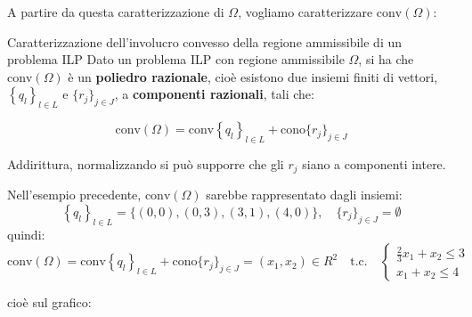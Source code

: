 \documentclass[a4paper,11pt]{article}
\begin{document}
A partire da questa caratterizzazione di $\Omega$, vogliamo caratterizzare $\mathrm{conv} (\Omega)$:

\begin{theorem}{Caratterizzazione dell'involucro convesso della regione ammissibile di un problema ILP}
	Dato un problema ILP con regione ammissibile $\Omega$, si ha che $\mathrm{conv}(\Omega)$ è un \textbf{poliedro razionale}, cioè esistono due insiemi finiti di vettori, $\left\{ q_l \right\}_{l \in L}$ e $\{ r_j \}_{j \in J}$, a \textbf{componenti razionali}, tali che:

$$
\mathrm{conv}(\Omega) = \mathrm{conv} \left\{ q_l \right\}_{l \in L} + \mathrm{cono} \{ r_j \}_{j \in J}
$$

\end{theorem}

Addirittura, normalizzando si può supporre che gli $r_j$ siano a componenti intere.

Nell'esempio precedente, $\mathrm{conv} (\Omega)$ sarebbe rappresentato dagli insiemi: 
$$
	\left\{ q_l \right\}_{l \in L} = \{ (0,0), (0,3), (3,1), (4,0) \}, \quad \{ r_j \}_{j \in J} = \emptyset 
$$
quindi:
$$
\mathrm{conv}(\Omega) = \mathrm{conv} \left\{ q_l \right\}_{l \in L} + \mathrm{cono} \{ r_j \}_{j \in J} = (x_1, x_2) \in{R^2} \quad  \text{t.c.} \quad
	\begin{cases}
		\frac{2}{3}x_1 + x_2 \leq 3 \\ 
		x_1 +x_2 \leq 4
	\end{cases}
$$

cioè sul grafico:
\end{document}
